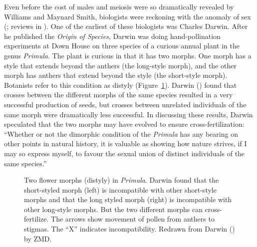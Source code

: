 \documentclass[
  letterpaper,
]{book}
\begin{document}
Even before the cost of males and meiosis were so dramatically revealed
by Williams and Maynard Smith, biologists were reckoning with the
anomaly of sex (; reviews in
). One of the earliest of
these biologists was Charles Darwin. After he published the \emph{Origin
of Species}, Darwin was doing hand-pollination experiments at Down House
on three species of a curious annual plant in the genus \emph{Primula}.
The plant is curious in that it has two morphs. One morph has a style
that extends beyond the anthers (the long-style morph), and the other
morph has anthers that extend beyond the style (the short-style morph).
Botanists refer to this condition as distyly (Figure~\ref{fig-1.3}).
Darwin () found that crosses between the
different morphs of the same species resulted in a very successful
production of seeds, but crosses between unrelated individuals of the
same morph were dramatically less successful. In discussing these
results, Darwin speculated that the two morphs may have evolved to
ensure cross-fertilization: ``Whether or not the dimorphic condition of
the \emph{Primula} has any bearing on other points in natural history,
it is valuable as showing how nature strives, if I may so express
myself, to favour the sexual union of distinct individuals of the same
species.''

\begin{figure}


\caption[Two flower morphs (distyly) in
\emph{Primula}]{\label{fig-1.3}Two flower morphs (distyly) in
\emph{Primula}. Darwin found that the short-styled morph (left) is
incompatible with other short-style morphs and that the long styled
morph (right) is incompatible with other long-style morphs. But the two
different morphs can cross-fertilize. The arrows show movement of pollen
from anthers to stigmas. The ``X'' indicates incompatibility. Redrawn
from Darwin () by ZMD.}

\end{figure}%
\end{document}
